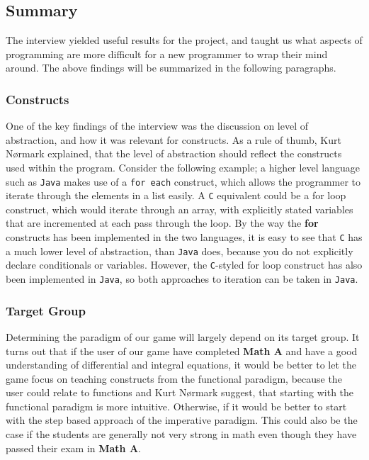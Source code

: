 \subsection{Summary}

The interview yielded useful results for the project, and taught us what aspects of programming are more difficult for a new programmer to wrap their mind around.
The above findings will be summarized in the following paragraphs.

\subsubsection{Constructs}

One of the key findings of the interview was the discussion on level of abstraction, and how it was relevant for constructs.
As a rule of thumb, Kurt N{\o}rmark explained, that the level of abstraction should reflect the constructs used within the program.
Consider the following example; a 
higher level language such as \texttt{Java} makes use of a \verb|for each| construct, which allows the programmer to iterate through the elements in a list easily.
A \texttt{C} equivalent could be a for loop construct, which would iterate through an array, with explicitly stated variables that are incremented at each pass through the loop.
By the way the \textbf{for} constructs has been implemented in the two languages, it is easy to see that \texttt{C} has a much lower level of abstraction, than \texttt{Java} does, because you do not explicitly declare conditionals or variables. 
However, the \texttt{C}-styled for loop construct has also been implemented in \texttt{Java}, so both approaches to iteration can be taken in \texttt{Java}.

\subsubsection{Target Group}

Determining the paradigm of our game will largely depend on its target group.
It turns out that if the user of our game have completed \textbf{Math A} and have a good understanding of differential and integral equations, it would be better to let the game focus on teaching constructs from the functional paradigm, because the user could relate to functions and Kurt N{\o}rmark suggest, that starting with the functional paradigm is more intuitive.
Otherwise, if it would be better to start with the step based approach of the imperative paradigm.
This could also be the case if the students are generally not very strong in math even though they have passed their exam in \textbf{Math A}.

